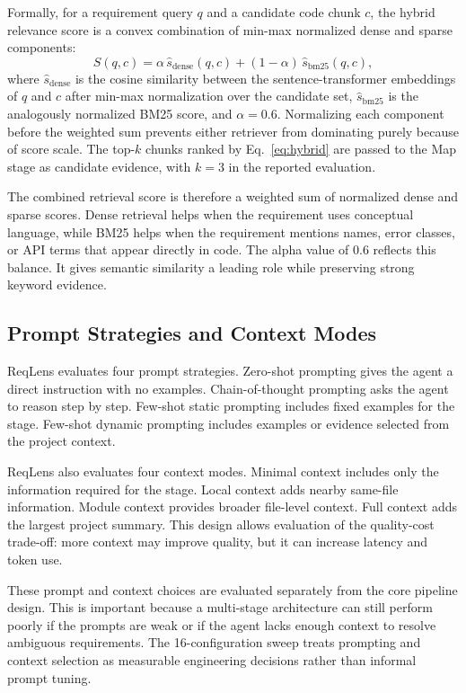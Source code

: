 \documentclass[conference]{IEEEtran}
\begin{document}
Formally, for a requirement query $q$ and a candidate code chunk $c$, the
hybrid relevance score is a convex combination of min-max normalized dense and
sparse components:
\begin{equation}
S(q,c) = \alpha \, \widehat{s}_{\text{dense}}(q,c) + (1-\alpha)\,
\widehat{s}_{\text{bm25}}(q,c),
\label{eq:hybrid}
\end{equation}
where $\widehat{s}_{\text{dense}}$ is the cosine similarity between the
sentence-transformer embeddings of $q$ and $c$ after min-max normalization
over the candidate set, $\widehat{s}_{\text{bm25}}$ is the analogously
normalized BM25 score, and $\alpha = 0.6$. Normalizing each component before
the weighted sum prevents either retriever from dominating purely because of
score scale. The top-$k$ chunks ranked by Eq.~\eqref{eq:hybrid} are passed to
the Map stage as candidate evidence, with $k=3$ in the reported evaluation.

The combined retrieval score is therefore a weighted sum of normalized dense
and sparse scores. Dense retrieval helps when the requirement uses conceptual
language, while BM25 helps when the requirement mentions names, error classes,
or API terms that appear directly in code. The alpha value of 0.6 reflects
this balance. It gives semantic similarity a leading role while preserving
strong keyword evidence.

\subsection{Prompt Strategies and Context Modes}
ReqLens evaluates four prompt strategies. Zero-shot prompting gives the agent a
direct instruction with no examples. Chain-of-thought prompting asks the agent
to reason step by step. Few-shot static prompting includes fixed examples for
the stage. Few-shot dynamic prompting includes examples or evidence selected
from the project context.

ReqLens also evaluates four context modes. Minimal context includes only the
information required for the stage. Local context adds nearby same-file
information. Module context provides broader file-level context. Full context
adds the largest project summary. This design allows evaluation of the
quality-cost trade-off: more context may improve quality, but it can increase
latency and token use.

These prompt and context choices are evaluated separately from the core
pipeline design. This is important because a multi-stage architecture can still
perform poorly if the prompts are weak or if the agent lacks enough context to
resolve ambiguous requirements. The 16-configuration sweep treats prompting and
context selection as measurable engineering decisions rather than informal
prompt tuning.
\end{document}
